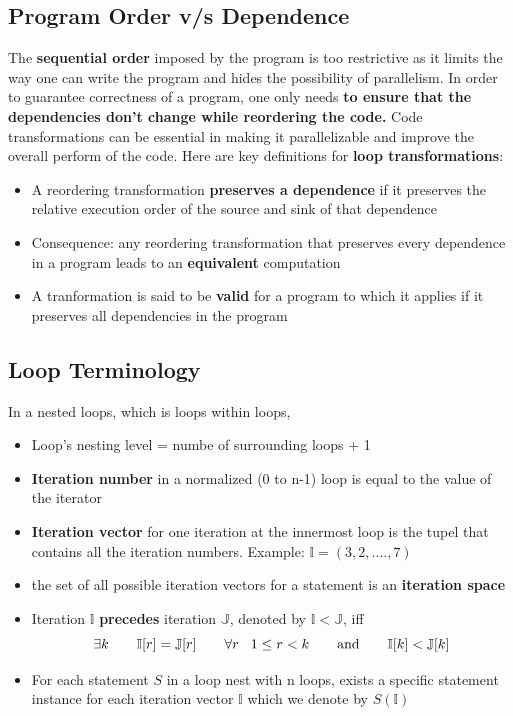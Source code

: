\documentclass[12pt, a4paper]{report}
\begin{document}
\subsection{Program Order v/s Dependence}
The {\bfseries{sequential order}} imposed by the program is too restrictive as it limits the way one can write the program and hides the possibility of
parallelism. In order to guarantee correctness of a program, one only needs {\bfseries{to ensure that the dependencies don't change while reordering the code.}}
Code transformations can be essential in making it parallelizable and improve the overall perform of the code. Here are key definitions for {\bfseries{loop 
transformations}}:
\begin{itemize}
    \item A reordering transformation {\bfseries{preserves a dependence}} if it preserves the relative execution order of the source and sink of that dependence
    \item Consequence: any reordering transformation that preserves every dependence in a program leads to an {\bfseries{equivalent}} computation
    \item A tranformation is said to be {\bfseries{valid}} for a program to which it applies if it preserves all dependencies in the program
\end{itemize}

\subsection{Loop Terminology}
In a nested loops, which is loops within loops, 
\begin{itemize}
    \item Loop's nesting level = numbe of surrounding loops + 1
    \item {\bfseries{Iteration number}} in a normalized (0 to n-1) loop is equal to the value of the iterator
    \item {\bfseries{Iteration vector}} for one iteration at the innermost loop is the tupel that contains all the iteration numbers. Example: $\mathbb{I} =
    (3, 2, ...., 7)$
    \item the set of all possible iteration vectors for a statement is an {\bfseries{iteration space}}
    \item Iteration $\mathbb{I}$ {\bfseries{precedes}} iteration $\mathbb{J}$, denoted by $\mathbb{I}<\mathbb{J}$, iff
    \begin{equation*}
        \exists k \qquad \mathbb{I}[r] = \mathbb{J}[r] \qquad \forall{r}\hspace{3mm} 1\leq r< k \qquad {\text{and}} \qquad \mathbb{I}[k] < \mathbb{J}[k]
    \end{equation*}
    \item For each statement $S$ in a loop nest with n loops, exists a specific statement instance for each iteration vector $\mathbb{I}$ which we denote by 
    $S(\mathbb{I})$
\end{itemize}
\end{document}
